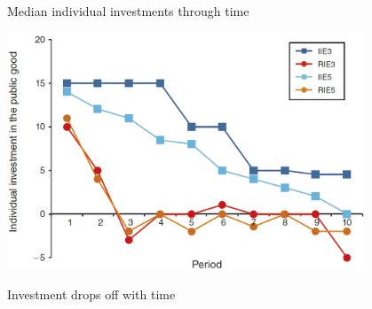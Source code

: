 \documentclass{beamer}
\begin{document}
\begin{frame}{Median individual investments through time}
 \begin{card}
    \begin{center}
        \includegraphics[width=0.8\textwidth]{./i/BNPfig3.png}
    \end{center}
\end{card}

\begin{card}
    Investment drops off with time
\end{card}
\end{frame}
\end{document}
